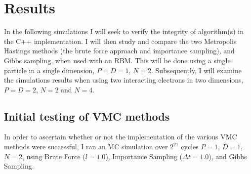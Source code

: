 \documentclass[%
oneside,                 %
final,                   %
10pt]{article}
\begin{document}
\section{Results} \label{results}
In the following simulations I will seek to verify the integrity of algorithm(s) in the C++ implementation. I will then study and compare the two Metropolis Hastings methods (the brute force approach and importance sampling), and Gibbs sampling, when used with an RBM. This will be done using a single particle in a single dimension, $P=D=1$, $N=2$. Subsequently, I will examine the simulations results when using two interacting electrons in two dimensions, $P=D=2$, $N=2$ and $N=4$.

\subsection{Initial testing of VMC methods}
In order to ascertain whether or not the implementation of the various VMC methods were successful, I ran an MC simulation over $2^{21}$ cycles $P=1$, $D=1$, $N=2$, using Brute Force ($l=1.0$), Importance Sampling ($\Delta t=1.0$), and Gibbs Sampling. 
\end{document}
